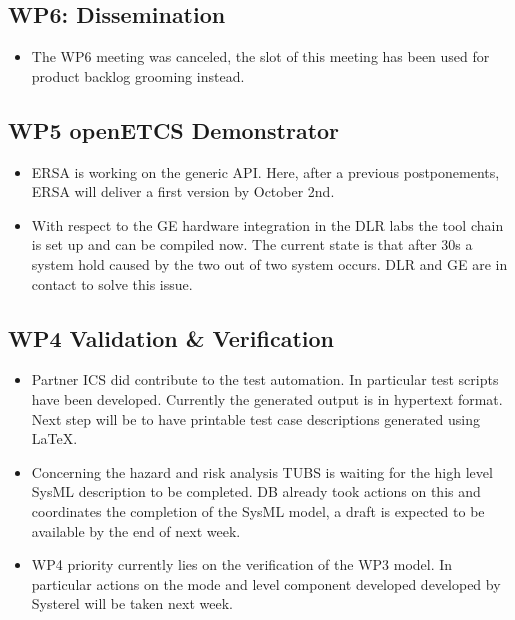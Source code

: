 \documentclass[a4paper, 11pt]{article}
\begin{document}
\subsection{WP6: Dissemination}
\begin{itemize}
\item The WP6 meeting was canceled, the slot of this meeting has been used for product backlog grooming instead.
\end{itemize}

\subsection{WP5 openETCS Demonstrator}
\begin{itemize}

\item ERSA is working on the generic API. Here, after a previous postponements, ERSA will deliver a first version by October 2nd.
\item With respect to the GE hardware integration in the DLR labs the tool chain is set up and can be compiled now. The current state is that after 30s a system hold caused by the two out of two system occurs. DLR and GE are in contact to solve this issue.
\end{itemize}

\subsection{WP4 Validation \& Verification}
\begin{itemize}
\item Partner ICS did contribute to the test automation. In particular test scripts have been developed. Currently the generated output is in hypertext format. Next step will be to have printable test case descriptions generated using LaTeX.
\item Concerning the hazard and risk analysis TUBS is waiting for the high level SysML description to be completed. DB already took actions on this and coordinates the completion of the SysML model, a draft is expected to be available by the end of next week.
\item WP4 priority currently lies on the verification of the WP3 model. In particular actions on the mode and level component developed developed by Systerel will be taken next week.
\end{itemize}
\end{document}
